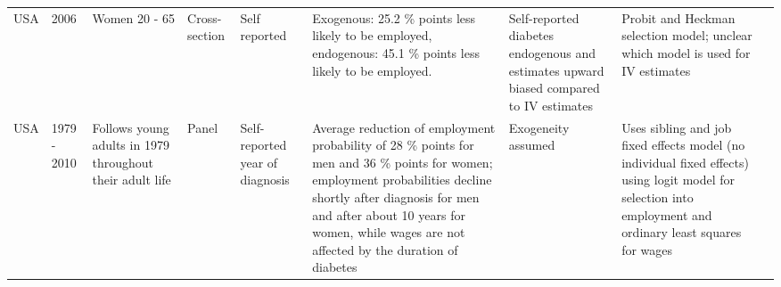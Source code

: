 \documentclass[12pt,english]{article}
\begin{document}
\begin{appendix}
{\begin{landscape}
\begin{tabularx}{\linewidth}{m m m m b b b b m}
USA       & 2006       & Women 20 - 65                                                      & Cross-section           & Self reported                                & Exogenous: 25.2 \% points less likely to be employed, endogenous: 45.1 \% points less likely to be employed.                                                                                                                                                                                                                                                                                                                                                                                                                                                                                                                                                     & Self-reported diabetes endogenous and estimates upward biased compared to IV estimates  & Probit and Heckman selection model; unclear which model is used for IV estimates                                                                                                                                                                                                                     & \textcite{Minor2011}                     \\
USA       & 1979 - 2010  & Follows young adults in 1979 throughout their adult life         & Panel                   & Self-reported year of diagnosis              & Average reduction of employment probability of 28 \% points for men and 36 \% points for women; employment probabilities decline shortly after diagnosis for men and after about 10 years for women, while wages are not affected by the duration of diabetes                                                                                                                                                                                                                                                                                                                                                                                                    & Exogeneity assumed                                                                      & Uses sibling and job fixed effects model (no individual fixed effects) using logit model for selection into employment and ordinary least squares for wages                                                                                                                                          & \textcite{Minor2013}                    \\

\end{tabularx}
\end{landscape}}
\end{appendix}
\end{document}
